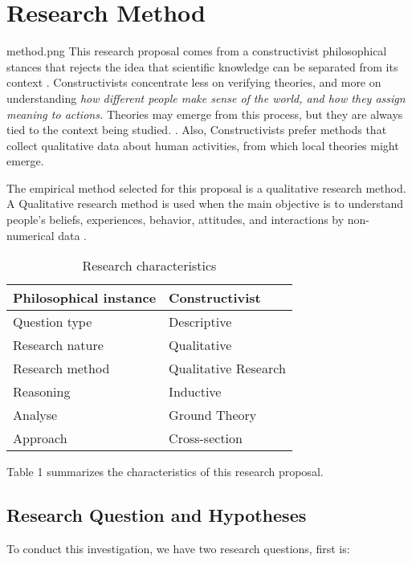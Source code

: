 \documentclass{TheMartianReport}
\begin{document}
\section{Research Method}{method.png}
This research proposal comes from a constructivist philosophical stances that rejects the idea that scientific knowledge can be separated from its context \cite{easterbrook2008selecting}.
 Constructivists concentrate less on verifying theories, and more on understanding \textit{how different people make sense of the world, and how they assign meaning to actions.} Theories may emerge from this process, but they are always tied to the context being studied. \cite{easterbrook2008selecting}. Also, Constructivists prefer methods that collect  qualitative data about human activities, from which local theories might emerge. 


The empirical method selected for this proposal is a qualitative research method. A Qualitative research method is used when the main objective is to understand people's beliefs, experiences, behavior, attitudes,  and interactions by non-numerical data
\cite{pathak2013qualitative}. 



\begin{table}[h]
\centering
\caption{Research characteristics}
\begin{tabular}{ll}
\hline
Philosophical instance & Constructivist   \\ \hline
Question type          & Descriptive \\ \hline
Research nature        & Qualitative \\ \hline
Research method        & Qualitative Research       \\ \hline
Reasoning              & Inductive      \\ \hline
Analyse                & Ground Theory  \\ \hline
Approach               & Cross-section   \\ \hline

\end{tabular}
\end{table}

Table 1 summarizes the characteristics of this research proposal.

\subsection{Research Question and Hypotheses }

To conduct this investigation, we have two research questions, first is:
 \newline
\end{document}
